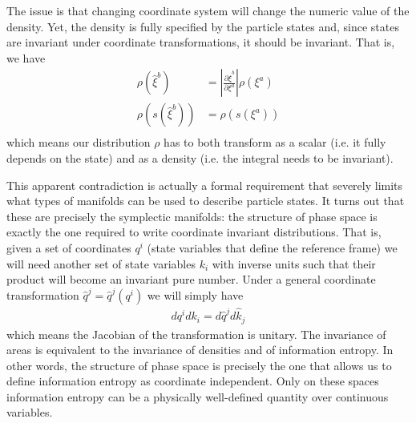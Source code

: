 \documentclass{article}
\begin{document}
The issue is that changing coordinate system will change the numeric value of the density. Yet, the density is fully specified by the particle states and, since states are invariant under coordinate transformations, it should be invariant. That is, we have
\begin{equation}
\begin{aligned}
\rho(\hat{\xi}^b) &= \left| \frac{\partial \hat{\xi}^b}{\partial \xi^a} \right| \rho(\xi^a) \\
\rho(s(\hat{\xi}^b)) &= \rho(s(\xi^a)) \\
\end{aligned}
\end{equation}
which means our distribution $\rho$ has to both transform as a scalar (i.e. it fully depends on the state) and as a density (i.e. the integral needs to be invariant).

This apparent contradiction is actually a formal requirement that severely limits what types of manifolds can be used to describe particle states. It turns out that these are precisely the symplectic manifolds: the structure of phase space is exactly the one required to write coordinate invariant distributions. That is, given a set of coordinates $q^i$ (state variables that define the reference frame) we will need another set of state variables $k_i$ with inverse units such that their product will become an invariant pure number. Under a general coordinate transformation $\hat{q}^j = \hat{q}^j (q^i)$ we will simply have 
\begin{equation}
\begin{aligned}
dq^i dk_i = d\hat{q}^j d\hat{k}_j
\end{aligned}
\end{equation}
which means the Jacobian of the transformation is unitary. The invariance of areas is equivalent to the invariance of densities and of information entropy. In other words, the structure of phase space is precisely the one that allows us to define information entropy as coordinate independent. Only on these spaces information entropy can be a physically well-defined quantity over continuous variables.
\end{document}
